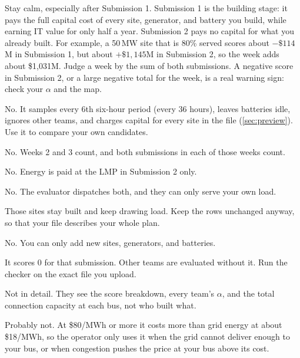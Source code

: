 \documentclass[10pt]{article}
\newcommand{\MW}{\ensuremath{\,\mathrm{MW}}}
\begin{document}
\begin{description}[style=nextline,leftmargin=0pt,itemsep=6pt]
\item[Why is my score negative?]
  Stay calm, especially after Submission 1. Submission 1 is the building stage:
  it pays the full capital cost of every site, generator, and battery you
  build, while earning IT value for only half a year. Submission 2 pays no
  capital for what you already built. For example, a 50\MW{} site that is
  80\% served scores about $-\$114$M in Submission 1, but about $+\$1{,}145$M
  in Submission 2, so the week adds about \$1,031M. Judge a week by the sum of
  both submissions. A negative score in Submission 2, or a large negative
  total for the week, is a real warning sign: check your $\alpha$ and the map.
\item[Is the preview my score?]
  No. It samples every 6th six-hour period (every 36 hours), leaves batteries idle, ignores other teams,
  and charges capital for every site in the file (\cref{sec:preview}). Use it to
  compare your own candidates.
\item[Does Week 1 count?]
  No. Weeks 2 and 3 count, and both submissions in each of those weeks count.
\item[Do I pay for energy in Submission 1?]
  No. Energy is paid at the LMP in Submission 2 only.
\item[Can I schedule my battery or sell power from my generator?]
  No. The evaluator dispatches both, and they can only serve your own load.
\item[What if I leave my Submission 1 rows out of Submission 2?]
  Those sites stay built and keep drawing load. Keep the rows unchanged anyway,
  so that your file describes your whole plan.
\item[Can I resize or move a site in Submission 2?]
  No. You can only add new sites, generators, and batteries.
\item[What happens if my file is invalid?]
  It scores 0 for that submission. Other teams are evaluated without it. Run the
  checker on the exact file you upload.
\item[Can other teams see my plan?]
  Not in detail. They see the score breakdown, every team's $\alpha$, and the
  total connection capacity at each bus, not who built what.
\item[My generator never seems to run. Is something wrong?]
  Probably not. At \$80/MWh or more it costs more than grid energy at about
  \$18/MWh, so the operator only uses it when the grid cannot deliver enough
  to your bus, or when congestion pushes the price at your bus above its cost.
\end{description}
\end{document}

